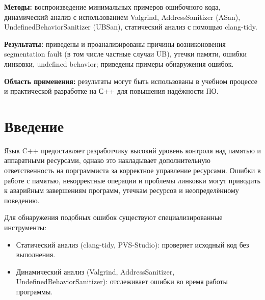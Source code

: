 \documentclass[14pt]{extreport}
\begin{document}
\textbf{Методы:} воспроизведение минимальных примеров ошибочного кода, динамический анализ с использованием Valgrind, AddressSanitizer (ASan), \\
\noindent UndefinedBehaviorSanitizer (UBSan), статический анализ с помощью clang-tidy. 

\textbf{Результаты:} приведены и проанализированы причины возниконовения segmentation fault (в том числе частные случаи UB), утечки памяти, ошибки линковки, undefined behavior; приведены примеры обнаружения ошибок. 

\textbf{Область применения:} результаты могут быть использованы в учебном процессе и практической разработке на С++ для повышения надёжности ПО.

\newpage
\renewcommand\contentsname{\vspace{-3.2cm}\centering\LargeСодержание}
\tableofcontents
\thispagestyle{empty}
\newpage
{\centering\section*{Введение}}
Язык C++ предоставляет разработчику высокий уровень контроля над памятью и аппаратными ресурсами, однако это накладывает дополнительную ответственность на порграммиста за корректное управление ресурсами. Ошибки в работе с памятью, некорректные операции и проблемы линковки могут приводить к аварийным завершениям программ, утечкам ресурсов и неопределённому поведению.

Для обнаружения подобных ошибок существуют специализированные инструменты: 
\begin{itemize}
    \item Статический анализ (clang-tidy, PVS-Studio): проверяет исходный код без выполнения. 
    \item Динамический анализ (Valgrind, AddressSanitizer, UndefinedBehaviorSanitizer): отслеживает ошибки во время работы программы. 
\end{itemize}
\end{document}
